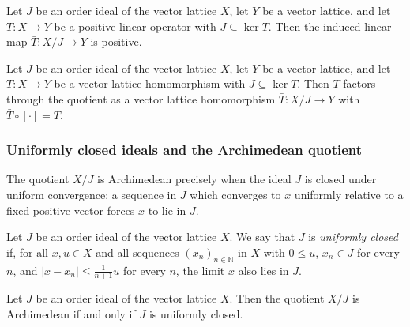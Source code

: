 \begin{lemma}
\label{lem:orderIdeal-liftQ-positive}
\leanok
{}
Let $J$ be an order ideal of the vector lattice $X$, let $Y$ be a
vector lattice, and let $T \colon X \to Y$ be a positive linear
operator with $J \subseteq \ker T$. Then the induced linear map
$\bar T \colon X / J \to Y$ is positive.
\end{lemma}

\begin{lemma}
\label{lem:orderIdeal-liftQVecLatHom}
\leanok
{}
Let $J$ be an order ideal of the vector lattice $X$, let $Y$ be a
vector lattice, and let $T \colon X \to Y$ be a vector lattice
homomorphism with $J \subseteq \ker T$. Then $T$ factors through
the quotient as a vector lattice homomorphism
$\bar T \colon X / J \to Y$ with $\bar T \circ [\cdot] = T$.
\end{lemma}

\subsubsection{Uniformly closed ideals and the Archimedean quotient}

The quotient $X / J$ is Archimedean precisely when the ideal $J$ is
closed under uniform convergence: a sequence in $J$ which converges
to $x$ uniformly relative to a fixed positive vector forces $x$ to
lie in $J$.

\begin{definition}
\label{def:orderIdeal-isUniformlyClosed}
\leanok
{}
Let $J$ be an order ideal of the vector lattice $X$. We say that
$J$ is \emph{uniformly closed} if, for all $x, u \in X$ and all
sequences $(x_n)_{n \in \mathbb{N}}$ in $X$ with $0 \le u$,
$x_n \in J$ for every $n$, and
$\lvert x - x_n \rvert \le \tfrac{1}{n + 1} u$ for every $n$, the
limit $x$ also lies in $J$.
\end{definition}

\begin{theorem}
\label{thm:orderIdeal-quotient-archimedean-iff-uniformlyClosed}
\leanok
{}
Let $J$ be an order ideal of the vector lattice $X$. Then the
quotient $X / J$ is Archimedean if and only if $J$ is uniformly
closed.
\end{theorem}

